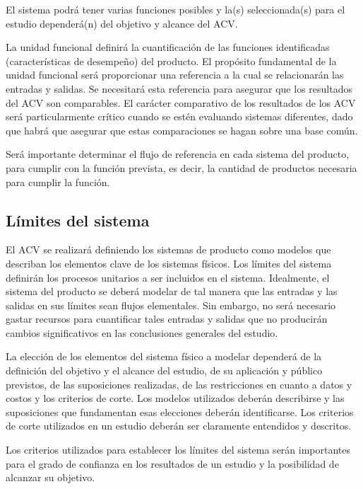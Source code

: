El sistema podrá tener varias funciones posibles y la(s) seleccionada(s) para el estudio dependerá(n) del objetivo y alcance del ACV.

La unidad funcional definirá la cuantificación de las funciones identificadas (características de desempeño) del producto. El propósito fundamental de la unidad funcional será proporcionar una referencia a la cual se relacionarán las entradas y salidas. Se necesitará esta referencia para asegurar que los resultados del ACV son comparables. El carácter comparativo de los resultados de los ACV será particularmente crítico cuando se estén evaluando sistemas diferentes, dado que habrá que asegurar que estas comparaciones se hagan sobre una base común.

Será importante determinar el flujo de referencia en cada sistema del producto, para cumplir con la función prevista, es decir, la cantidad de productos necesaria para cumplir la función.

\subsection{Límites del sistema}

El ACV se realizará definiendo los sistemas de producto como modelos que describan los elementos clave de los sistemas físicos. Los límites del sistema definirán los procesos unitarios a ser incluidos en el sistema. Idealmente, el sistema del producto se deberá modelar de tal manera que las entradas y las salidas en sus límites sean flujos elementales. Sin embargo, no será necesario gastar recursos para cuantificar tales entradas y salidas que no producirán cambios significativos en las conclusiones generales del estudio.

La elección de los elementos del sistema físico a modelar dependerá de la definición del objetivo y el alcance del estudio, de su aplicación y público previstos, de las suposiciones realizadas, de las restricciones en cuanto a datos y costos y los criterios de corte. Los modelos utilizados deberán describirse y las suposiciones que fundamentan esas elecciones deberán identificarse. Los criterios de corte utilizados en un estudio deberán ser claramente entendidos y descritos.

Los criterios utilizados para establecer los límites del sistema serán importantes para el grado de confianza en los resultados de un estudio y la posibilidad de alcanzar su objetivo.

